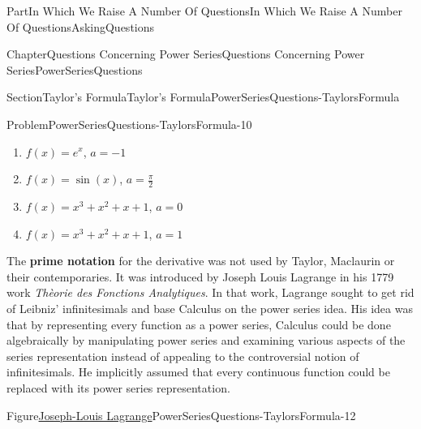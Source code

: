 \documentclass[oneside,10pt,]{book}
\newcommand{\terminology}[1]{\textbf{#1}}
\numberwithin{equation}{part}
\begin{document}
\begin{partptx}{Part}{In Which We Raise A Number Of Questions}{}{In Which We Raise A Number Of Questions}{}{}{AskingQuestions}
\begin{chapterptx}{Chapter}{Questions Concerning Power Series}{}{Questions Concerning Power Series}{}{}{PowerSeriesQuestions}
\begin{sectionptx}{Section}{Taylor's Formula}{}{Taylor's Formula}{}{}{PowerSeriesQuestions-TaylorsFormula}
\begin{problem}{Problem}{}{PowerSeriesQuestions-TaylorsFormula-10}
\begin{enumerate}[font=\bfseries,label=(\alph*),ref=\alph*]
\item{}\(f(x)=e^x\), \(a=-1\)%
\item{}\(f(x)=\sin(x) \), \(a=\frac{\pi }{2}\)%
\item{}\(f(x)=x^3+x^2+x+1\), \(a=0\)%
\item{}\(f(x)=x^3+x^2+x+1\), \(a=1\)%
\end{enumerate}%
\end{problem}
The \terminology{prime notation} for the derivative was not used by Taylor, Maclaurin or their contemporaries.  It was introduced by Joseph Louis Lagrange in his 1779 work \textit{Thèorie des Fonctions Analytiques}. In that work, Lagrange sought to get rid of Leibniz' infinitesimals and base Calculus on the power series idea.  His idea was that by representing every function as a power series, Calculus could be done algebraically by manipulating power series and examining various aspects of the series representation instead of appealing to the controversial notion of infinitesimals.  He implicitly assumed that every continuous function could be replaced with its power series representation.%
\begin{figureptx}{Figure}{\href{https://mathshistory.st-andrews.ac.uk/Biographies/Lagrange/}{Joseph-Louis Lagrange}}{PowerSeriesQuestions-TaylorsFormula-12}{}%
%
%
\begin{image}{0.325}{0.35}{0.325}{}%

\end{image}
\end{figureptx}
\end{sectionptx}
\end{chapterptx}
\end{partptx}
\end{document}
